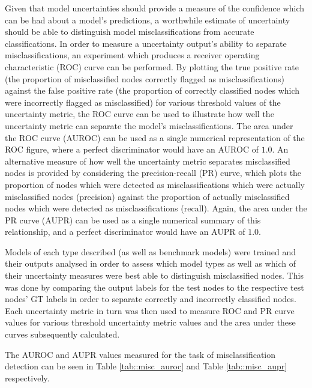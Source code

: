 \documentclass[
twocolumn,
]{ceurart}
\begin{document}
Given that model uncertainties should provide a measure of the confidence which can be had about a model's predictions, a worthwhile estimate of uncertainty should be able to distinguish model misclassifications from accurate classifications.
In order to measure a uncertainty output's ability to separate misclassifications, an experiment which produces a receiver operating characteristic (ROC) curve can be performed.
By plotting the true positive rate (the proportion of misclassified nodes correctly flagged as misclassifications) against the false positive rate (the proportion of correctly classified nodes which were incorrectly flagged as misclassified) for various threshold values of the uncertainty metric, the ROC curve can be used to illustrate how well the uncertainty metric can separate the model's misclassifications.
The area under the ROC curve (AUROC) can be used as a single numerical representation of the ROC figure, where a perfect discriminator would have an AUROC of $1.0$.
An alternative measure of how well the uncertainty metric separates misclassified nodes is provided by considering the precision-recall (PR) curve, which plots the proportion of nodes which were detected as misclassifications which were actually misclassified nodes (precision) against the proportion of actually misclassified nodes which were detected as misclassifications (recall).
Again, the area under the PR curve (AUPR) can be used as a single numerical summary of this relationship, and a perfect discriminator would have an AUPR of $1.0$.

Models of each type described (as well as benchmark models) were trained and their outputs analysed in order to assess which model types as well as which of their uncertainty measures were best able to distinguish misclassified nodes.
This was done by comparing the output labels for the test nodes to the respective test nodes' GT labels in order to separate correctly and incorrectly classified nodes.
Each uncertainty metric in turn was then used to measure ROC and PR curve values for various threshold uncertainty metric values and the area under these curves subsequently calculated.

The AUROC and AUPR values measured for the task of misclassification detection can be seen in Table \ref{tab::misc_auroc} and Table \ref{tab::misc_aupr} respectively.
\end{document}
